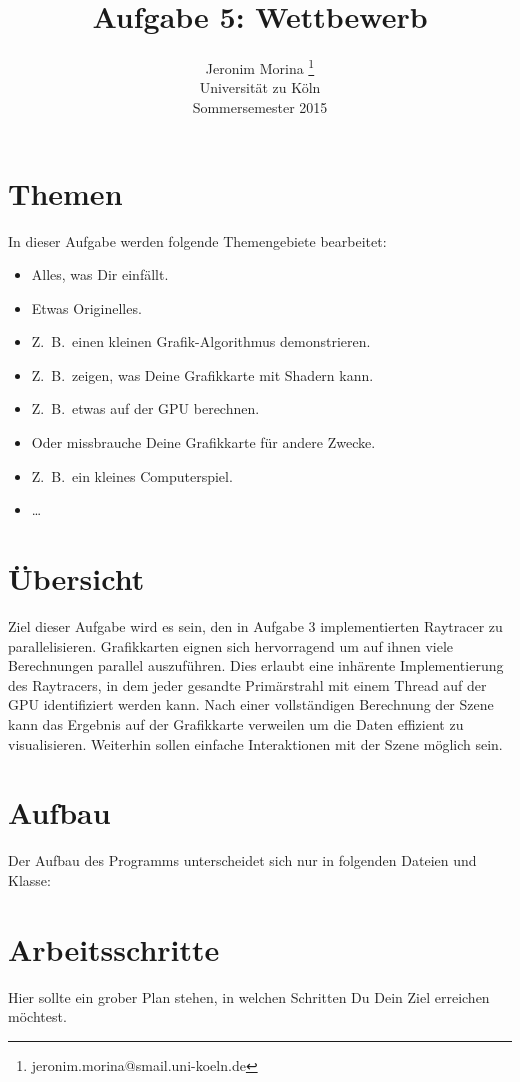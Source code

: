 \documentclass[10pt]{article}
\title{Aufgabe 5: Wettbewerb}
\author{Jeronim Morina \thanks{jeronim.morina@smail.uni-koeln.de}\\
        \scriptsize Universität zu Köln\\
        Sommersemester 2015
}
\begin{document}
\maketitle

\begin{multicols}{2}

\section{Themen}
In dieser Aufgabe werden folgende Themengebiete bearbeitet:
\begin{itemize}
\item Alles, was Dir einfällt.
\item Etwas Originelles.
\item Z.~B.\ einen kleinen Grafik-Algorithmus demonstrieren.
\item Z.~B.\ zeigen, was Deine Grafikkarte mit Shadern kann.
\item Z.~B.\ etwas auf der GPU berechnen.
\item Oder missbrauche Deine Grafikkarte für andere Zwecke.
\item Z.~B.\ ein kleines Computerspiel.
\item \dots
\end{itemize}


\section{Übersicht}

Ziel dieser Aufgabe wird es sein, den in Aufgabe 3 implementierten Raytracer zu parallelisieren. Grafikkarten eignen sich hervorragend um auf ihnen viele Berechnungen parallel auszuführen. Dies erlaubt eine inhärente Implementierung des Raytracers, in dem jeder gesandte Primärstrahl mit einem Thread auf der GPU identifiziert werden kann. Nach einer vollständigen Berechnung der Szene kann das Ergebnis auf der Grafikkarte verweilen um die Daten effizient zu visualisieren. Weiterhin sollen einfache Interaktionen mit der Szene möglich sein. 

\section{Aufbau} 

Der Aufbau des Programms unterscheidet sich nur in folgenden Dateien und Klasse:


\section{Arbeitsschritte}
Hier sollte ein grober Plan stehen, in welchen Schritten Du Dein Ziel
erreichen möchtest.

\end{multicols}
\end{document}
